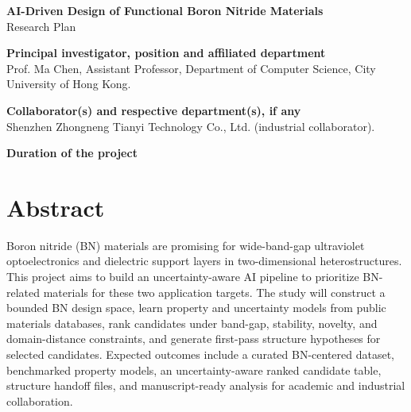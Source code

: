 \documentclass[10pt]{article}
\newcommand{\blank}[1][8em]{\colorbox{yellow!35}{\rule{0pt}{1.1em}\hspace{#1}}}
\begin{document}
\begin{center}
{\Large \textbf{AI-Driven Design of Functional Boron Nitride Materials}}\\
{\normalsize Research Plan}
\end{center}

\textbf{Principal investigator, position and affiliated department}\\
Prof. Ma Chen, Assistant Professor, Department of Computer Science, City University of Hong Kong.

\textbf{Collaborator(s) and respective department(s), if any}\\
Shenzhen Zhongneng Tianyi Technology Co., Ltd. (industrial collaborator).

\textbf{Duration of the project}\\
\blank[18em]

\section*{Abstract}
Boron nitride (BN) materials are promising for wide-band-gap ultraviolet optoelectronics and dielectric support layers in two-dimensional heterostructures. This project aims to build an uncertainty-aware AI pipeline to prioritize BN-related materials for these two application targets. The study will construct a bounded BN design space, learn property and uncertainty models from public materials databases, rank candidates under band-gap, stability, novelty, and domain-distance constraints, and generate first-pass structure hypotheses for selected candidates. Expected outcomes include a curated BN-centered dataset, benchmarked property models, an uncertainty-aware ranked candidate table, structure handoff files, and manuscript-ready analysis for academic and industrial collaboration.
\end{document}
